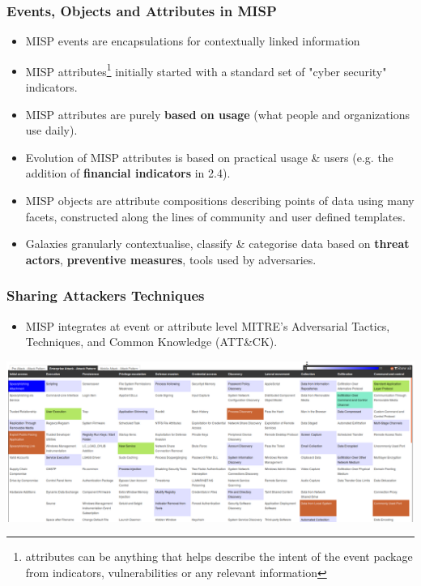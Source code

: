 \begin{frame}
        \frametitle{Events, Objects and Attributes in MISP}
         \begin{itemize}
                \item MISP events are encapsulations for contextually linked information
                \item MISP attributes\footnote{attributes can be anything that helps describe the intent of the event package from indicators, vulnerabilities or any relevant information} initially started with a standard set of "cyber security" indicators.
                \item MISP attributes are purely {\bf based on usage} (what people and organizations use daily).
                \item Evolution of MISP attributes is based on practical usage \& users (e.g. the addition of {\bf financial indicators} in 2.4).
                \item MISP objects are attribute compositions describing points of data using many facets, constructed along the lines of community and user defined templates.
                \item Galaxies granularly contextualise, classify \& categorise data based on {\bf threat actors}, {\bf preventive measures}, tools used by adversaries.
        \end{itemize}
\end{frame}
\begin{frame}
        \frametitle{Sharing Attackers Techniques}
        \begin{itemize}
                \item MISP integrates at event or attribute level MITRE's Adversarial Tactics, Techniques, and Common Knowledge (ATT\&CK).
        \end{itemize}
        \includegraphics[scale=0.2]{screenshots/attack-screenshot.png}
\end{frame}

